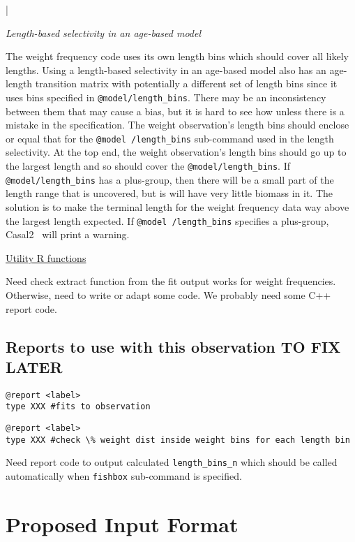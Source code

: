 \documentclass[a4paper,11pt,twoside,pdftex,draft]{article}
\newcommand{\CNAME}{Casal2}
\begin{document}
|

\emph{Length-based selectivity in an age-based model}

The weight frequency code uses its own length bins which should cover all likely lengths. Using a length-based selectivity in an age-based model also has an age-length transition matrix with potentially a different set of length bins since it uses bins specified in \texttt{@model/length\_bins}. There may be an inconsistency between them that may cause a bias, but it is hard to see how unless there is a mistake in the specification. The weight observation's length bins should enclose or equal that for the \texttt{@model /length\_bins}  sub-command used in the length selectivity. At the top end, the weight observation's length bins should go up to the largest length and so should cover the \texttt{@model/length\_bins}. If \texttt{@model/length\_bins}   has a plus-group, then there will be a small part of the length range that is uncovered, but is will have very little biomass in it. The solution is to make the terminal length for the weight frequency data way above the largest length expected. If 
\texttt{@model /length\_bins} specifies a plus-group, \CNAME~ will print a warning.


\bigskip
\underline{Utility R functions}

Need check extract function from the fit output works for weight frequencies. Otherwise, need to write or adapt some code. 
We probably need some C++ report code. 

\subsection{Reports to use with this observation TO FIX LATER}

{\small{\begin{verbatim}
@report <label>
type XXX #fits to observation

\end{verbatim}}}


{\small{\begin {verbatim}
@report <label>
type XXX #check \% weight dist inside weight bins for each length bin

\end{verbatim}}}

Need report code to output calculated \texttt{length\_bins\_n} which should be called automatically when \texttt{fishbox} sub-command is specified.


\section{Proposed Input Format}
\end{document}
